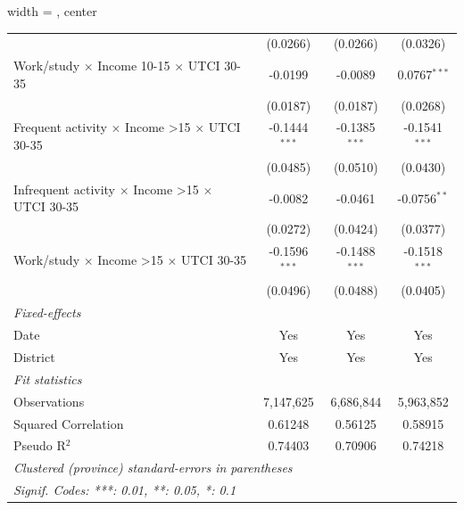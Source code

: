 \begin{table}[htbp]
\begin{adjustbox}{width = \textwidth, center}
\begin{tabular}{lccc}
                                                                         & (0.0266)                  & (0.0266)                & (0.0326)\\   
         Work/study $\times$ Income 10-15 $\times$ UTCI 30-35            & -0.0199                   & -0.0089                 & 0.0767$^{***}$\\   
                                                                         & (0.0187)                  & (0.0187)                & (0.0268)\\   
         Frequent activity $\times$ Income >15 $\times$ UTCI 30-35       & -0.1444$^{***}$           & -0.1385$^{***}$         & -0.1541$^{***}$\\   
                                                                         & (0.0485)                  & (0.0510)                & (0.0430)\\   
         Infrequent activity $\times$ Income >15 $\times$ UTCI 30-35     & -0.0082                   & -0.0461                 & -0.0756$^{**}$\\   
                                                                         & (0.0272)                  & (0.0424)                & (0.0377)\\   
         Work/study $\times$ Income >15 $\times$ UTCI 30-35              & -0.1596$^{***}$           & -0.1488$^{***}$         & -0.1518$^{***}$\\   
                                                                         & (0.0496)                  & (0.0488)                & (0.0405)\\   
         \midrule
         \emph{Fixed-effects}\\
         Date                                                            & Yes                       & Yes                     & Yes\\  
         District                                                        & Yes                       & Yes                     & Yes\\  
         \midrule
         \emph{Fit statistics}\\
         Observations                                                    & 7,147,625                 & 6,686,844               & 5,963,852\\  
         Squared Correlation                                             & 0.61248                   & 0.56125                 & 0.58915\\  
         Pseudo R$^2$                                                    & 0.74403                   & 0.70906                 & 0.74218\\  
         \midrule \midrule
         \multicolumn{4}{l}{\emph{Clustered (province) standard-errors in parentheses}}\\
         \multicolumn{4}{l}{\emph{Signif. Codes: ***: 0.01, **: 0.05, *: 0.1}}\\
      \end{tabular}
   \end{adjustbox}
\end{table}



